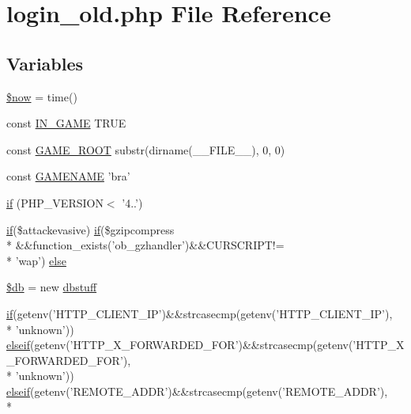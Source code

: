 \hypertarget{login__old_8php}{\section{login\+\_\+old.\+php File Reference}
\label{login__old_8php}
}
\subsection*{Variables}
\begin{DoxyCompactItemize}
\item 
\hyperlink{login__old_8php_af1d5ccdee975b8f4d20aaffc5b28557c}{\$now} = time()
\item 
const \hyperlink{login__old_8php_a12c82f3d28569a3f80804f1e72cef14c}{I\+N\+\_\+\+G\+A\+M\+E} T\+R\+U\+E
\item 
const \hyperlink{login__old_8php_a8e43cd27c8e744fff590983bc396aba3}{G\+A\+M\+E\+\_\+\+R\+O\+O\+T} substr(dirname(\+\_\+\+\_\+\+F\+I\+L\+E\+\_\+\+\_\+), 0, 0)
\item 
const \hyperlink{login__old_8php_a3cd7223880b2f6a1d0bcb325ce43c606}{G\+A\+M\+E\+N\+A\+M\+E} 'bra'
\item 
\hyperlink{login__old_8php_a4ac1118c2e44c513a674bc1793ba6c90}{if} (P\+H\+P\+\_\+\+V\+E\+R\+S\+I\+O\+N$<$  '4..')
\item 
\hyperlink{login__old_8php_a4ac1118c2e44c513a674bc1793ba6c90}{if}(\$attackevasive) \hyperlink{login__old_8php_a4ac1118c2e44c513a674bc1793ba6c90}{if}(\$gzipcompress \\*
\&\&function\+\_\+exists('ob\+\_\+gzhandler')\&\&C\+U\+R\+S\+C\+R\+I\+P\+T!= \\*
'wap') \hyperlink{login__old_8php_af8cdd260460533dff40cf690aabc08c7}{else}
\item 
\hyperlink{login__old_8php_a1fa3127fc82f96b1436d871ef02be319}{\$db} = new \hyperlink{classdbstuff}{dbstuff}
\item 
\hyperlink{login__old_8php_a4ac1118c2e44c513a674bc1793ba6c90}{if}(getenv('H\+T\+T\+P\+\_\+\+C\+L\+I\+E\+N\+T\+\_\+\+I\+P')\&\&strcasecmp(getenv('H\+T\+T\+P\+\_\+\+C\+L\+I\+E\+N\+T\+\_\+\+I\+P'), \\*
'unknown')) \hyperlink{urlist_8php_a77f52b43f81ed05a41b68c2161789055}{elseif}(getenv('H\+T\+T\+P\+\_\+\+X\+\_\+\+F\+O\+R\+W\+A\+R\+D\+E\+D\+\_\+\+F\+O\+R')\&\&strcasecmp(getenv('H\+T\+T\+P\+\_\+\+X\+\_\+\+F\+O\+R\+W\+A\+R\+D\+E\+D\+\_\+\+F\+O\+R'), \\*
'unknown')) \hyperlink{urlist_8php_a77f52b43f81ed05a41b68c2161789055}{elseif}(getenv('R\+E\+M\+O\+T\+E\+\_\+\+A\+D\+D\+R')\&\&strcasecmp(getenv('R\+E\+M\+O\+T\+E\+\_\+\+A\+D\+D\+R'), \\*

\end{DoxyCompactItemize}

